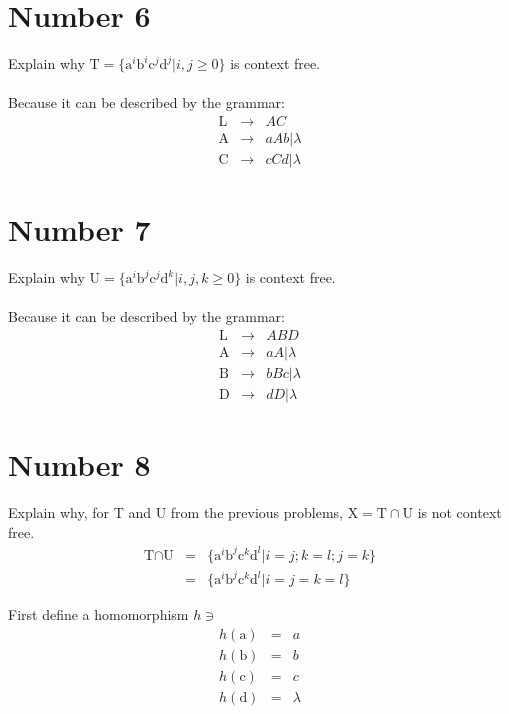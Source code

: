 \documentclass[12pt,a4paper,twoside]{article}  %
\begin{document}
\section{Number 6}

Explain why $\textrm{T} =
  \{\textrm{a}^i\textrm{b}^i\textrm{c}^j\textrm{d}^j | i, j \geq 0\}$
  is context free.\\\\
Because it can be described by the grammar:
\begin{eqnarray}
\textrm{L}        &\rightarrow& AC \\
\textrm{A}        &\rightarrow& aAb | \lambda \\
\textrm{C}        &\rightarrow& cCd | \lambda
\end{eqnarray}

\section{Number 7}

Explain why $\textrm{U} =
  \{\textrm{a}^i\textrm{b}^j\textrm{c}^j\textrm{d}^k | i, j, k \geq
  0\}$ is context free.\\\\
Because it can be described by the grammar:
\begin{eqnarray}
\textrm{L}        &\rightarrow& ABD \\
\textrm{A}        &\rightarrow& aA | \lambda \\
\textrm{B}        &\rightarrow& bBc | \lambda \\
\textrm{D}        &\rightarrow& dD | \lambda
\end{eqnarray}

\section{Number 8}

Explain why, for T and U from the previous problems, $\textrm{X} =
\textrm{T} \cap \textrm{U}$ is not context free.
\begin{eqnarray}
\textrm{T} \cap \textrm{U} &=&
  \{\textrm{a}^i\textrm{b}^j\textrm{c}^k\textrm{d}^l| i = j; k = l; j
  = k\} \\
                           &=&
  \{\textrm{a}^i\textrm{b}^j\textrm{c}^k\textrm{d}^l| i = j = k = l\}
\end{eqnarray}

First define a homomorphism $h \ni$
\begin{eqnarray}
h(\textrm{a}) &=& a \\
h(\textrm{b}) &=& b \\
h(\textrm{c}) &=& c \\
h(\textrm{d}) &=& \lambda
\end{eqnarray}
\end{document}
